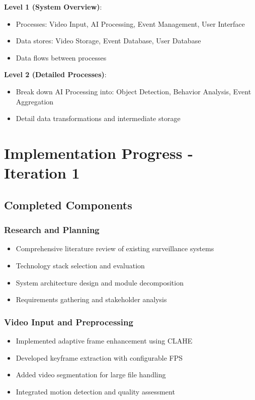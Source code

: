 \documentclass[12pt,a4paper]{article}
\begin{document}
\textbf{Level 1 (System Overview)}:
\begin{itemize}
    \item Processes: Video Input, AI Processing, Event Management, User Interface
    \item Data stores: Video Storage, Event Database, User Database
    \item Data flows between processes
\end{itemize}

\textbf{Level 2 (Detailed Processes)}:
\begin{itemize}
    \item Break down AI Processing into: Object Detection, Behavior Analysis, Event Aggregation
    \item Detail data transformations and intermediate storage
\end{itemize}

\clearpage

\section{Implementation Progress - Iteration 1}

\subsection{Completed Components}

\subsubsection{Research and Planning}
\begin{itemize}
    \item Comprehensive literature review of existing surveillance systems
    \item Technology stack selection and evaluation
    \item System architecture design and module decomposition
    \item Requirements gathering and stakeholder analysis
\end{itemize}

\subsubsection{Video Input and Preprocessing}
\begin{itemize}
    \item Implemented adaptive frame enhancement using CLAHE
    \item Developed keyframe extraction with configurable FPS
    \item Added video segmentation for large file handling
    \item Integrated motion detection and quality assessment
\end{itemize}
\end{document}
